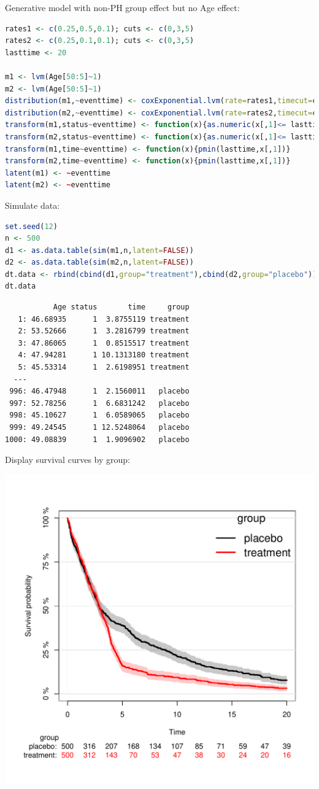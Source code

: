 \documentclass{article}
\begin{document}
Generative model with non-PH group effect but no Age effect:
\begin{lstlisting}[language=r,numbers=none]
rates1 <- c(0.25,0.5,0.1); cuts <- c(0,3,5)
rates2 <- c(0.25,0.1,0.1); cuts <- c(0,3,5)
lasttime <- 20

m1 <- lvm(Age[50:5]~1)
m2 <- lvm(Age[50:5]~1)
distribution(m1,~eventtime) <- coxExponential.lvm(rate=rates1,timecut=cuts)
distribution(m2,~eventtime) <- coxExponential.lvm(rate=rates2,timecut=cuts)
transform(m1,status~eventtime) <- function(x){as.numeric(x[,1]<= lasttime)}
transform(m2,status~eventtime) <- function(x){as.numeric(x[,1]<= lasttime)}
transform(m1,time~eventtime) <- function(x){pmin(lasttime,x[,1])}
transform(m2,time~eventtime) <- function(x){pmin(lasttime,x[,1])}
latent(m1) <- ~eventtime
latent(m2) <- ~eventtime
\end{lstlisting}

Simulate data:
\begin{lstlisting}[language=r,numbers=none]
set.seed(12)
n <- 500
d1 <- as.data.table(sim(m1,n,latent=FALSE))
d2 <- as.data.table(sim(m2,n,latent=FALSE))
dt.data <- rbind(cbind(d1,group="treatment"),cbind(d2,group="placebo"))
dt.data
\end{lstlisting}

\label{}
\begin{verbatim}
           Age status       time     group
   1: 46.68935      1  3.8755119 treatment
   2: 53.52666      1  3.2816799 treatment
   3: 47.86065      1  0.8515517 treatment
   4: 47.94281      1 10.1313180 treatment
   5: 45.53314      1  2.6198951 treatment
  ---                                     
 996: 46.47948      1  2.1560011   placebo
 997: 52.78256      1  6.6831242   placebo
 998: 45.10627      1  6.0589065   placebo
 999: 49.24545      1 12.5248064   placebo
1000: 49.08839      1  1.9096902   placebo
\end{verbatim}

Display survival curves by group:
\begin{center}
\includegraphics[width=.9\linewidth]{./figures/fig-delayedTreatmentEffect.pdf}
\label{}
\end{center}
\end{document}
